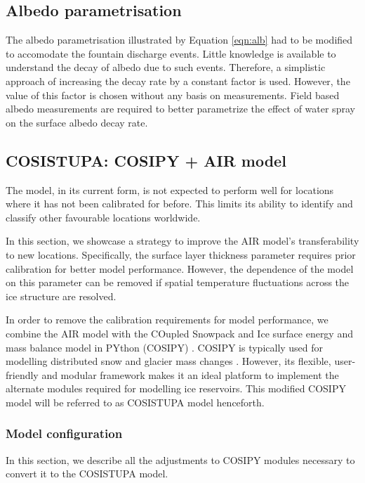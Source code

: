 \subsection{Albedo parametrisation}

The albedo parametrisation illustrated by Equation \ref{eqn:alb} had to be modified to accomodate the fountain
discharge events. Little knowledge is available to understand the decay of albedo due to such events. Therefore,
a simplistic approach of increasing the decay rate by a constant factor is used. However, the value of this
factor is chosen without any basis on measurements. Field based albedo measurements are required to better
parametrize the effect of water spray on the surface albedo decay rate.

\subsection{COSISTUPA: COSIPY + AIR model}

The model, in its current form, is not expected to perform well for locations where it has not been calibrated
for before. This limits its ability to identify and classify other favourable locations worldwide.

In this section, we showcase a strategy to improve the AIR model's transferability to new locations.
Specifically, the surface layer thickness parameter requires prior calibration for better model performance.
However, the dependence of the model on this parameter can be removed if spatial temperature fluctuations across
the ice structure are resolved.

In order to remove the calibration requirements for model performance, we combine the AIR model with the COupled
Snowpack and Ice surface energy and mass balance model in PYthon (COSIPY) . COSIPY is typically used for
modelling distributed snow and glacier mass changes \citep{sauterCOSIPYV1Opensource2020}. However, its flexible,
user-friendly and modular framework makes it an ideal platform to implement the alternate modules required for
modelling ice reservoirs. This modified COSIPY model will be referred to as COSISTUPA model henceforth.

\subsubsection{Model configuration}

In this section, we describe all the adjustments to COSIPY modules necessary to convert it to the COSISTUPA
model.

